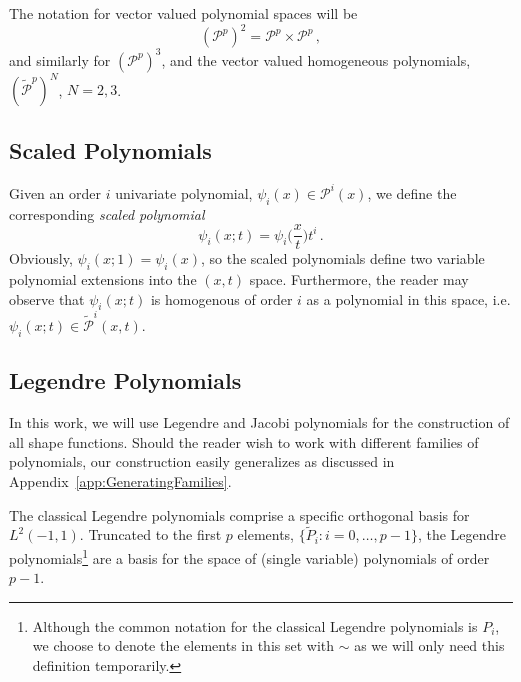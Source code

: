The notation for vector valued polynomial spaces will be
\begin{equation}
	(\mathcal{P}^p)^2 = \mathcal{P}^p\times\mathcal{P}^p\,,
\end{equation}
and similarly for $\left(\mathcal{P}^p\right)^3$, and the vector valued homogeneous polynomials, $(\tilde{\mathcal{P}}^p)^N$, $N=2,3$.

\subsection{Scaled Polynomials}

Given an order $i$ univariate polynomial, $\psi_i(x)\in\mathcal{P}^i(x)$, we define the corresponding {\em scaled polynomial}
\begin{equation}
	\psi_i(x; t) = \psi_i\Big(\frac{x}{t}\Big) t^i \, .
	\label{eq:scaledpolyomials}
\end{equation}
Obviously, $\psi_i(x;1) = \psi_i(x)$, so the scaled polynomials define two variable polynomial extensions into the $(x,t)$ space.
Furthermore, the reader may observe that $\psi_i(x;t)$ is homogenous of order $i$ as a polynomial in this space, i.e. $\psi_i(x;t)\in\tilde{\mathcal{P}}^i(x,t)$.

\subsection{Legendre Polynomials}
\label{sec:LegendrePol}

In this work, we will use Legendre and Jacobi polynomials for the construction of all shape functions. Should the reader wish to work with different families of polynomials, our construction easily generalizes as discussed in Appendix~\ref{app:GeneratingFamilies}.

The classical Legendre polynomials comprise a specific orthogonal basis for $L^2(-1,1)$. Truncated to the first $p$ elements, $\{\tilde{P}_i:i=0,\ldots,p-1\}$, the Legendre polynomials\footnote{Although the common notation for the classical Legendre polynomials is $P_i$, we choose to denote the elements in this set with $\sim$ as we will only need this definition temporarily.} are a basis for the space of (single variable) polynomials of order $p-1$.

